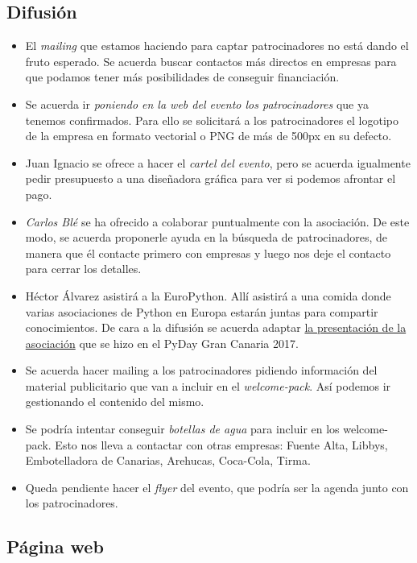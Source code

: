 \documentclass[a4paper, 12pt]{article}
\begin{document}
\subsection*{Difusión}

\begin{itemize}
    \item El \textit{mailing} que estamos haciendo para captar patrocinadores no está dando el fruto esperado. Se acuerda buscar contactos más directos en empresas para que podamos tener más posibilidades de conseguir financiación.
    \item Se acuerda ir \textit{poniendo en la web del evento los patrocinadores} que ya tenemos confirmados. Para ello se solicitará a los patrocinadores el logotipo de la empresa en formato vectorial o PNG de más de 500px en su defecto.
    \item Juan Ignacio se ofrece a hacer el \textit{cartel del evento}, pero se acuerda igualmente pedir presupuesto a una diseñadora gráfica para ver si podemos afrontar el pago.
    \item \textit{Carlos Blé} se ha ofrecido a colaborar puntualmente con la asociación. De este modo, se acuerda proponerle ayuda en la búsqueda de patrocinadores, de manera que él contacte primero con empresas y luego nos deje el contacto para cerrar los detalles.
    \item Héctor Álvarez asistirá a la EuroPython. Allí asistirá a una comida donde varias asociaciones de Python en Europa estarán juntas para compartir conocimientos. De cara a la difusión se acuerda adaptar \href{https://slides.com/sdelquin/pythoncanarias}{la presentación de la asociación} que se hizo en el PyDay Gran Canaria 2017.
    \item Se acuerda hacer mailing a los patrocinadores pidiendo información del material publicitario que van a incluir en el \textit{welcome-pack}. Así podemos ir gestionando el contenido del mismo.
    \item Se podría intentar conseguir \textit{botellas de agua} para incluir en los welcome-pack. Esto nos lleva a contactar con otras empresas: Fuente Alta, Libbys, Embotelladora de Canarias, Arehucas, Coca-Cola, Tirma.
    \item Queda pendiente hacer el \textit{flyer} del evento, que podría ser la agenda junto con los patrocinadores.
\end{itemize}

\subsection*{Página web}
\end{document}
